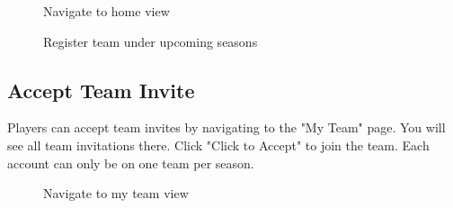\documentclass{article}
\begin{document}
\begin{figure}[H]
    \centering
    \caption{Navigate to home view}
\end{figure}
\begin{figure}[H]
    \caption{Register team under upcoming seasons}
\end{figure}

\subsection{Accept Team Invite}
Players can accept team invites by navigating to the "My Team" page. You will see all team invitations there. Click "Click to Accept" to join the team. Each account can only be on one team per season.

\begin{figure}[H]
    \centering
    \caption{Navigate to my team view}
\end{figure}
\end{document}
